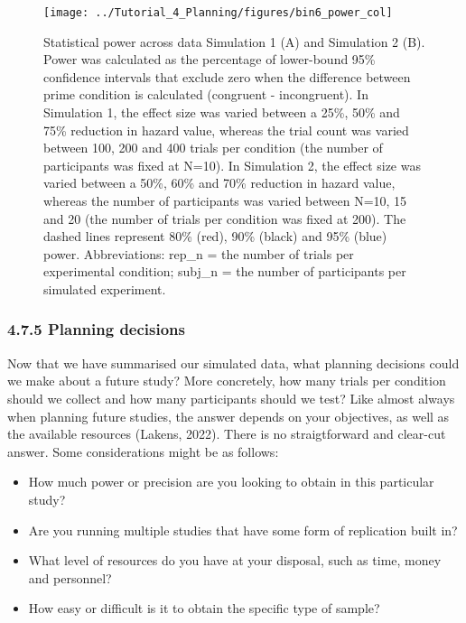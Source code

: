 \documentclass[
  man, donotrepeattitle,floatsintext]{apa6}
\providecommand{\tightlist}{%
  \setlength{\itemsep}{0pt}\setlength{\parskip}{0pt}}
\begin{document}
\begin{figure}[H]

{\centering \texttt{[image: ../Tutorial\_4\_Planning/figures/bin6\_power\_col]} 

}

\caption{Statistical power across data Simulation 1 (A) and Simulation 2 (B). Power was calculated as the percentage of lower-bound 95\% confidence intervals that exclude zero when the difference between prime condition is calculated (congruent - incongruent). In Simulation 1, the effect size was varied between a 25\%, 50\% and 75\% reduction in hazard value, whereas the trial count was varied between 100, 200 and 400 trials per condition (the number of participants was fixed at N=10). In Simulation 2, the effect size was varied between a 50\%, 60\% and 70\% reduction in hazard value, whereas the number of participants was varied between N=10, 15 and 20 (the number of trials per condition was fixed at 200). The dashed lines represent 80\% (red), 90\% (black) and 95\% (blue) power. Abbreviations: rep\_n = the number of trials per experimental condition; subj\_n = the number of participants per simulated experiment.}\label{fig:power}
\end{figure}

\subsubsection{4.7.5 Planning decisions}\label{planning-decisions}

Now that we have summarised our simulated data, what planning decisions could we make about a future study?
More concretely, how many trials per condition should we collect and how many participants should we test?
Like almost always when planning future studies, the answer depends on your objectives, as well as the available resources (Lakens, 2022).
There is no straigtforward and clear-cut answer.
Some considerations might be as follows:

\begin{itemize}
\tightlist
\item
  How much power or precision are you looking to obtain in this particular study?
\item
  Are you running multiple studies that have some form of replication built in?
\item
  What level of resources do you have at your disposal, such as time, money and personnel?
\item
  How easy or difficult is it to obtain the specific type of sample?
\end{itemize}
\end{document}

